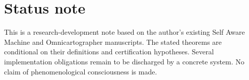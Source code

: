 \documentclass[11pt]{article}
\theoremstyle{remark}
\begin{document}
\section*{Status note}
This is a research-development note based on the author's existing Self Aware Machine and Omnicartographer manuscripts. The stated theorems are conditional on their definitions and certification hypotheses. Several implementation obligations remain to be discharged by a concrete system. No claim of phenomenological consciousness is made.
\end{document}
